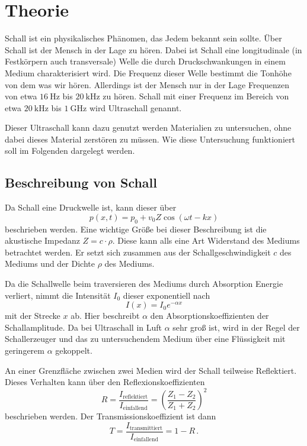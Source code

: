 \section{Theorie}
\label{sec:Theorie}

Schall ist ein physikalisches Phänomen, das Jedem bekannt sein sollte. 
Über Schall ist der Mensch in der Lage zu hören.
Dabei ist Schall eine longitudinale (in Festkörpern auch transversale) Welle die durch Druckschwankungen in einem Medium charakterisiert wird.
Die Frequenz dieser Welle bestimmt die Tonhöhe von dem was wir hören.
Allerdings ist der Mensch nur in der Lage Frequenzen von etwa $\SI{16}{\hertz}$ bis $\SI{20}{\kilo\hertz}$ zu hören.
Schall mit einer Frequenz im Bereich von etwa $\SI{20}{\kilo\hertz}$ bis $\SI{1}{\giga\hertz}$ wird Ultraschall genannt. \cite{US1}

Dieser Ultraschall kann dazu genutzt werden Materialien zu untersuchen, ohne dabei dieses Material zerstören zu müssen.
Wie diese Untersuchung funktioniert soll im Folgenden dargelegt werden.


\subsection{Beschreibung von Schall}
\label{ssec:theorie_beschreibung}

Da Schall eine Druckwelle ist, kann dieser über
\begin{equation}
    p(x,t) = p_0 + v_0 Z \cos(\omega t - k x)
    \label{eq:schallwelle}
\end{equation}
beschrieben werden. 
Eine wichtige Größe bei dieser Beschreibung ist die akustische Impedanz $Z=c \cdot \rho$.
Diese kann alls eine Art Widerstand des Mediums betrachtet werden.
Er setzt sich zusammen aus der Schallgeschwindigkeit $c$ des Mediums und der Dichte $\rho$ des Mediums.

Da die Schallwelle beim traversieren des Mediums durch Absorption Energie verliert, nimmt die Intensität $I_0$ dieser exponentiell nach
\begin{equation}
    I(x) = I_0 e^{-\alpha x}
    \label{eq:absorption}
\end{equation}
mit der Strecke $x$ ab. 
Hier beschreibt $\alpha$ den Absorptionskoeffizienten der Schallamplitude.
Da bei Ultraschall in Luft $\alpha$ sehr groß ist, wird in der Regel der Schallerzeuger und das zu untersuchendem Medium über eine Flüssigkeit mit geringerem $\alpha$ gekoppelt.

An einer Grenzfläche zwischen zwei Medien wird der Schall teilweise Reflektiert.
Dieses Verhalten kann über den Reflexionskoeffizienten
\begin{equation}
    R = \frac{I_\text{reflektiert}}{I_\text{einfallend}} = \left( \frac{Z_1 - Z_2}{Z_1 + Z_2} \right)^2
    \label{eq:refelxion}
\end{equation}
beschrieben werden.
Der Transmissionskoeffizient ist dann
\begin{equation}
    T = \frac{I_\text{transmittiert}}{I_\text{einfallend}} = 1 - R \, .
    \label{eq:transmission}
\end{equation}


